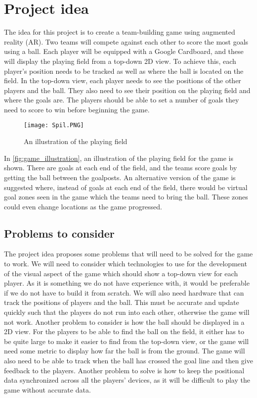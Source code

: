 \section{Project idea}\label{sec:projectidea}
The idea for this project is to create a team-building game using augmented reality (AR).
Two teams will compete against each other to score the most goals using a ball. 
Each player will be equipped with a Google Cardboard, and these will display the playing field from a top-down 2D view. 
To achieve this, each player's position needs to be tracked as well as where the ball is located on the field.
In the top-down view, each player needs to see the positions of the other players and the ball.
They also need to see their position on the playing field and where the goals are.
The players should be able to set a number of goals they need to score to win before beginning the game. 
\begin{figure}[H]
    \centering
    \texttt{[image: Spil.PNG]}
    \caption{An illustration of the playing field}
    \label{fig:game_illustration}
\end{figure}
In \autoref{fig:game_illustration}, an illustration of the playing field for the game is shown.
There are goals at each end of the field, and the teams score goals by getting the ball between the goalposts.
An alternative version of the game is suggested where, instead of goals at each end of the field, there would be virtual goal zones seen in the game which the teams need to bring the ball.
These zones could even change locations as the game progressed.
\subsection{Problems to consider}
The project idea proposes some problems that will need to be solved for the game to work.
We will need to consider which technologies to use for the development of the visual aspect of the game which should show a top-down view for each player. 
As it is something we do not have experience with, it would be preferable if we do not have to build it from scratch.
We will also need hardware that can track the positions of players and the ball.
This must be accurate and update quickly such that the players do not run into each other, otherwise the game will not work.
Another problem to consider is how the ball should be displayed in a 2D view.
For the players to be able to find the ball on the field, it either has to be quite large to make it easier to find from the top-down view, or the game will need some metric to display how far the ball is from the ground.
The game will also need to be able to track when the ball has crossed the goal line and then give feedback to the players.
Another problem to solve is how to keep the positional data synchronized across all the players' devices, as it will be difficult to play the game without accurate data.
